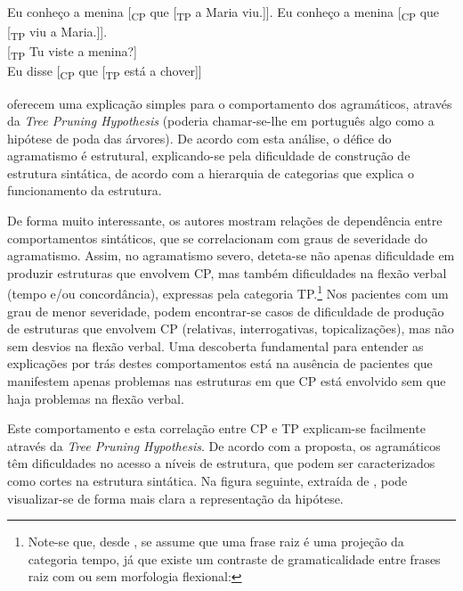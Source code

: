 \documentclass[output=paper,colorlinks,citecolor=brown,booklanguage=portuguese]{langscibook}
\begin{document}
\ea\label{ex:cap2ex29}
    \z
        \ea Eu conheço a menina [\textsubscript{CP} que [\textsubscript{TP} a Maria viu.]]. 
        \ex Eu conheço a menina [\textsubscript{CP} que [\textsubscript{TP} viu a Maria.]].
    \z
    \\
     {[\textsubscript{TP} Tu viste a menina?]}
    \\
     Eu disse [\textsubscript{CP} que [\textsubscript{TP} está a chover]]
    \z
\z

\citet{Friedmann1997} oferecem uma explicação simples para o comportamento dos agramáticos, através da \emph{Tree Pruning Hypothesis} (poderia cha\-mar-se-lhe em português algo como a hipótese de poda das árvores). De acordo com esta análise, o défice do agramatismo é estrutural, explicando-se pela dificuldade de construção de estrutura sintática, de acordo com a hierarquia de categorias que explica o funcionamento da estrutura.

De forma muito interessante, os autores mostram relações de dependência entre comportamentos sintáticos, que se correlacionam com graus de severidade do agramatismo. Assim, no agramatismo severo, deteta-se não apenas dificuldade em produzir estruturas que envolvem CP, mas também dificuldades na flexão verbal (tempo e/ou concordância), expressas pela categoria TP.\footnote{Note-se que, desde \citet{Chomsky1986}, se assume que uma frase raiz é uma projeção da categoria tempo, já que existe um contraste de gramaticalidade entre frases raiz com ou sem morfologia flexional:

\ea
    \z
\z
} Nos pacientes com um grau de menor severidade, podem encontrar-se casos de dificuldade de produção de estruturas que envolvem CP (relativas, interrogativas, topicalizações), mas não sem desvios na flexão verbal. Uma descoberta fundamental para entender as explicações por trás destes comportamentos está na ausência de pacientes que manifestem apenas problemas nas estruturas em que CP está envolvido sem que haja problemas na flexão verbal.

Este comportamento e esta correlação entre CP e TP explicam-se facilmente através da \emph{Tree Pruning Hypothesis}. De acordo com a proposta, os agramáticos têm dificuldades no acesso a níveis de estrutura, que podem ser caracterizados como cortes na estrutura sintática. Na figura seguinte, extraída de \citet{Friedmann1997}, pode visualizar-se de forma mais clara a representação da hipótese.
\end{document}
